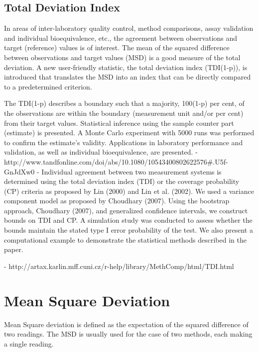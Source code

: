 \documentclass[MAIN.tex]{subfiles}
\begin{document}
\subsection*{Total Deviation Index}
In areas of inter-laboratory quality control, method comparisons, assay validation and individual bioequivalence, etc., the agreement between observations and target (reference) values is of interest. The mean of the squared difference between observations and target values (MSD) is a good measure of the total deviation. A new user-friendly statistic, the total deviation index (TDI(1-p)), is introduced that translates the MSD into an index that can be directly compared to a predetermined criterion. 

The TDI(1-p) describes a boundary such that a majority, 100(1-p) per cent, of the observations are within the boundary (measurement unit and/or per cent) from their target values. Statistical inference using the sample counter part (estimate) is presented. A Monte Carlo experiment with 5000 runs was performed to confirm the estimate's validity. Applications in laboratory performance and validation, as well as individual bioequivalence, are presented.
- http://www.tandfonline.com/doi/abs/10.1080/10543400802622576#.U5f-GnJdXw0
- 
Individual agreement between two measurement systems is determined using the total deviation index (TDI) or the coverage probability (CP) criteria as proposed by Lin (2000) and Lin et al. (2002). We used a variance component model as proposed by Choudhary (2007). Using the bootstrap approach, Choudhary (2007), and generalized confidence intervals, we construct bounds on TDI and CP. A simulation study was conducted to assess whether the bounds maintain the stated type I error probability of the test. We also present a computational example to demonstrate the statistical methods described in the paper.

- http://artax.karlin.mff.cuni.cz/r-help/library/MethComp/html/TDI.html

\newpage
\section{Mean Square Deviation}
Mean Square deviation is defined as the expectation of the squared difference of two readings.
The MSD is usually used for the case of two methods, each making a single reading.
\end{document}
